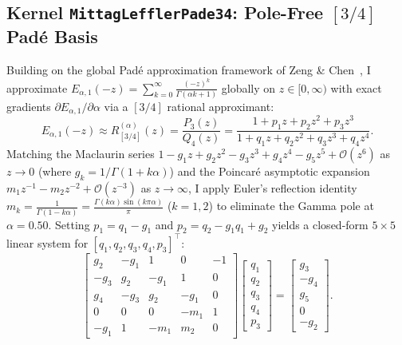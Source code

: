 \documentclass[10pt,twocolumn,a4paper]{article}
\begin{document}
\subsection{Kernel \texttt{MittagLefflerPade34}: Pole-Free $[3/4]$ Pad\'e Basis}

Building on the global Pad\'e approximation framework of Zeng \& Chen~\cite{zeng2015}, I approximate $E_{\alpha,1}(-z) = \sum_{k=0}^\infty \frac{(-z)^k}{\Gamma(\alpha k + 1)}$ globally on $z \in [0, \infty)$ with exact gradients $\partial E_{\alpha,1}/\partial\alpha$ via a $[3/4]$ rational approximant:
\begin{equation}
  E_{\alpha,1}(-z) \approx R_{[3/4]}^{(\alpha)}(z) = \frac{P_3(z)}{Q_4(z)} = \frac{1 + p_1 z + p_2 z^2 + p_3 z^3}{1 + q_1 z + q_2 z^2 + q_3 z^3 + q_4 z^4}. \label{eq:pade34}
\end{equation}
Matching the Maclaurin series $1 - g_1 z + g_2 z^2 - g_3 z^3 + g_4 z^4 - g_5 z^5 + \mathcal{O}(z^6)$ as $z \to 0$ (where $g_k = 1/\Gamma(1+k\alpha)$) and the Poincar\'e asymptotic expansion $m_1 z^{-1} - m_2 z^{-2} + \mathcal{O}(z^{-3})$ as $z \to \infty$, I apply Euler's reflection identity $m_k = \frac{1}{\Gamma(1-k\alpha)} = \frac{\Gamma(k\alpha)\sin(k\pi\alpha)}{\pi}$ ($k=1,2$) to eliminate the Gamma pole at $\alpha=0.50$. Setting $p_1 = q_1 - g_1$ and $p_2 = q_2 - g_1 q_1 + g_2$ yields a closed-form $5\times 5$ linear system for $[q_1, q_2, q_3, q_4, p_3]^\top$:
\begin{equation}
  \begin{bmatrix}
    g_2 & -g_1 & 1 & 0 & -1 \\
    -g_3 & g_2 & -g_1 & 1 & 0 \\
    g_4 & -g_3 & g_2 & -g_1 & 0 \\
    0 & 0 & 0 & -m_1 & 1 \\
    -g_1 & 1 & -m_1 & m_2 & 0
  \end{bmatrix}
  \begin{bmatrix} q_1 \\ q_2 \\ q_3 \\ q_4 \\ p_3 \end{bmatrix} =
  \begin{bmatrix} g_3 \\ -g_4 \\ g_5 \\ 0 \\ -g_2 \end{bmatrix}. \label{eq:pade_system}
\end{equation}
\end{document}
